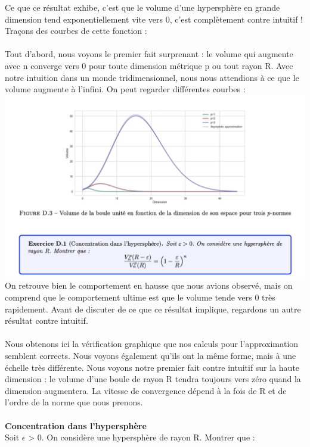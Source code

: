 Ce que ce résultat exhibe, c’est que le volume d’une hypersphère en grande dimension tend exponentiellement vite vers 0, c’est complètement contre intuitif ! Traçons des courbes de cette fonction :
\\
\\
Tout d'abord, nous voyons le premier fait surprenant : le volume qui augmente avec n converge vers 0 pour toute dimension métrique p ou tout rayon R. Avec notre intuition dans un monde tridimensionnel, nous nous attendions à ce que le volume augmente à l'infini. On peut regarder différentes courbes :
\\
\includegraphics[width=\linewidth]{./img/notions_math/courbe}
\\
On retrouve bien le comportement en hausse que nous avions observé, mais on comprend que le comportement ultime est que le volume tende vers 0 très rapidement. Avant de discuter de ce que ce résultat implique, regardons un autre résultat contre intuitif.
\\
\\
Nous obtenons ici la vérification graphique que nos calculs pour l'approximation semblent corrects. Nous voyons également qu'ils ont la même forme, mais à une échelle très différente. Nous voyons notre premier fait contre intuitif sur la haute dimension : le volume d'une boule de rayon R tendra toujours vers zéro quand la dimension augmentera. La vitesse de convergence dépend à la fois de R et de l'ordre de la norme que nous prenons.
\\
\\
\textbf{Concentration dans l’hypersphère}
\\
Soit $\epsilon$ > 0. On considère une hypersphère de rayon R. Montrer que :
\\
\\
